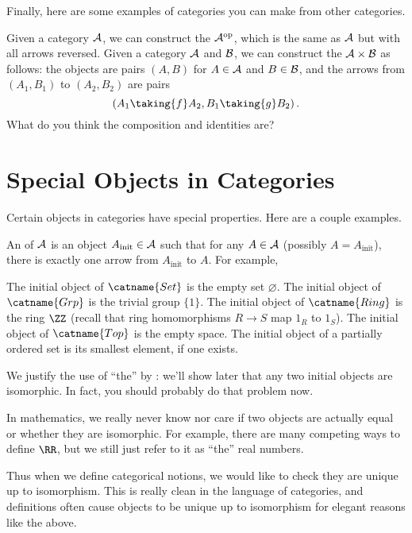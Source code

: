 Finally, here are some examples of categories you can make from other categories.
\begin{example}
	\listhack
	\begin{enumerate}[(a)]
		\ii Given a category $\AA$, we can construct the 
		$\AA^{\text{op}}$, which is the same as $\AA$ but with all arrows reversed.
		\ii Given a category $\AA$ and $\BB$, we can construct the  $\AA \times \BB$
		as follows: the objects are pairs $(A, B)$ for $A \in \AA$ and $B \in \BB$,
		and the arrows from $(A_1, B_1)$ to $(A_2, B_2)$
		are pairs \[ \left( A_1 \taking{f} A_2, B_1 \taking{g} B_2 \right). \]
		What do you think the composition and identities are?
	\end{enumerate}
\end{example}

\section{Special Objects in Categories}
Certain objects in categories have special properties.
Here are a couple examples.
\begin{example}
	An  of $\AA$ is an object
	$A_{\text{init}} \in \AA$ such that for any $A \in \AA$ (possibly $A = A_{\text{init}}$),
	there is exactly one arrow from $A_{\text{init}}$ to $A$.
	For example,
	\begin{enumerate}[(a)]
		\ii The initial object of $\catname{Set}$ is the empty set $\varnothing$.
		\ii The initial object of $\catname{Grp}$ is the trivial group $\{1\}$.
		\ii The initial object of $\catname{Ring}$ is the ring $\ZZ$
		(recall that ring homomorphisms $R \to S$ map $1_R$ to $1_S$).
		\ii The initial object of $\catname{Top}$ is the empty space.
		\ii The initial object of a partially ordered set is its smallest element, if one exists.
	\end{enumerate}
\end{example}

We justify the use of ``the'' by :
we'll show later that any two initial objects are isomorphic.
In fact, you should probably do that problem now.
\begin{remark}
	In mathematics, we really never know nor care if two objects are actually equal
	or whether they are isomorphic.
	For example, there are many competing ways to define $\RR$,
	but we still just refer to it as ``the'' real numbers.

	Thus when we define categorical notions, we would like to check they are
	unique up to isomorphism.
	This is really clean in the language of categories, and definitions
	often cause objects to be unique up to isomorphism for elegant reasons like the above.
\end{remark}


